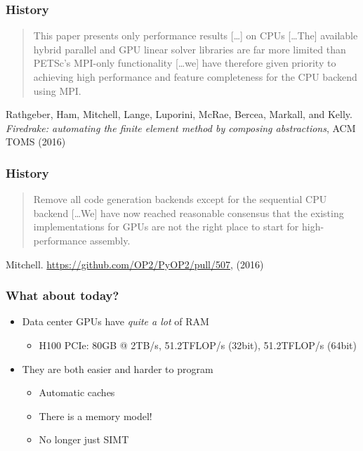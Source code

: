 \documentclass[aspectratio=169]{beamer}
\begin{document}
\begin{frame}
  \frametitle{History}
  \begin{quote}
    This paper presents only performance results [\dots] on CPUs
    [\dots The] available hybrid parallel and GPU linear solver
    libraries are far more limited than PETSc’s MPI-only functionality
    [\dots we] have therefore given priority to achieving high
    performance and feature completeness for the CPU backend using
    MPI.\@
  \end{quote}
  \pause
  {
    \scriptsize
    \raggedleft
    Rathgeber, Ham, Mitchell, Lange, Luporini, McRae, Bercea, Markall,
    and Kelly. \emph{Firedrake: automating the finite element method
      by composing abstractions}, ACM TOMS (2016)
    \par
  }
\end{frame}

\begin{frame}
  \frametitle{History}
  \begin{quote}
    Remove all code generation backends except for the sequential CPU
    backend [\dots We]
    have now reached reasonable consensus that the existing
    implementations for GPUs are not the right place to start for
    high-performance assembly.
  \end{quote}
  \pause
  {
    \scriptsize
    \raggedleft
    Mitchell. \url{https://github.com/OP2/PyOP2/pull/507}, (2016)
    \par
  }
\end{frame}

\begin{frame}
  \frametitle{What about today?}

  \begin{itemize}
  \item Data center GPUs have \emph{quite a lot} of RAM
    \begin{itemize}
    \item H100 PCIe: 80GB @ 2TB/s, 51.2TFLOP/s (32bit), 51.2TFLOP/s (64bit)
    \end{itemize}
  \item They are both easier and harder to program
    \begin{itemize}
    \item Automatic caches
    \item There is a memory model!
    \item No longer just SIMT
    \end{itemize}
  \end{itemize}
\end{frame}
\end{document}

